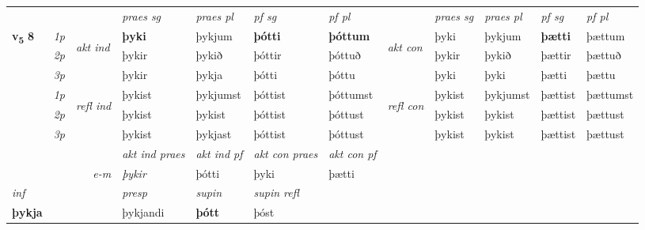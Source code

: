 \begin{longtable}[l]{X>{\footnotesize\itshape}llXXXXlXXXX}
 & &   & \textit{praes sg}  & \textit{praes pl}    & \textit{ pf sg} & \textit{pf pl} & & \textit{praes sg}  & \textit{praes pl}    & \textit{pf sg} & \textit{pf pl }  \\ \cmidrule{4-7} \cmidrule{9-12}
 \multirow{2}{*}{{{\textbf{v{\textsubscript{5}}} \Large{\textbf{8}}}}}  & 1p & \multirow{3}{*}{\begin{turn}{90}\textit{akt ind}\end{turn}} & \textbf{þyki} & þykjum & \textbf{þótti} & \textbf{þóttum} & \multirow{3}{*}{\begin{turn}{90}\textit{akt con}\end{turn}} &þyki & þykjum & \textbf{þætti} & þættum\\*
 & 2p &  &  þykir  & þykið & þóttir & þóttuð & & þykir & þykið & þættir & þættuð \\*
 & 3p &  & þykir & þykja & þótti & þóttu & & þyki & þyki& þætti & þættu \\*
\cmidrule{4-7} \cmidrule{9-12}
 & 1p & \multirow{3}{*}{\begin{turn}{90}\textit{refl ind}\end{turn}}  & þykist & þykjumst & þóttist & þóttumst & \multirow{3}{*}{\begin{turn}{90}\textit{refl con}\end{turn}}  &þykist & þykjumst & þættist & þættumst \\*
 & 2p &  & þykist & þykist & þóttist & þóttust & &þykist & þykist & þættist & þættust \\*
 & 3p  & & þykist & þykjast & þóttist & þóttust & & þykist & þykist& þættist & þættust \\*
\cmidrule{4-7} \cmidrule{9-12}

   && &  \textit{akt ind praes} & \textit{akt ind pf} & \textit{akt con praes} & \textit{akt con pf} \\*
\multicolumn{3}{r}{\textit{e-m}} & þykir & þótti & þyki & þætti \\*

\cmidrule{4-7}
   {\textit{inf}} & &     & \textit{presp} & \textit{supin} & \textit{supin refl}  \\*
  {\textbf{þykja}} & &     & þykjandi &  \textbf{þótt} & þóst  \\*

\midrule


\end{longtable}
